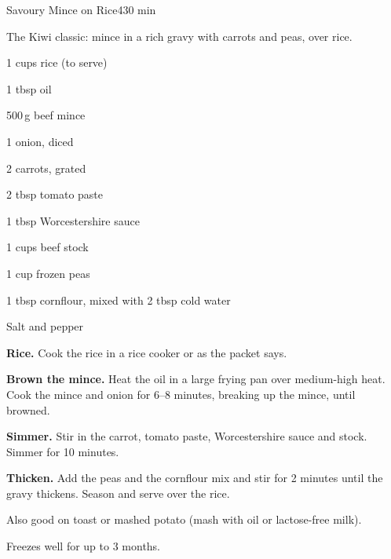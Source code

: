 \begin{recipebox}{Savoury Mince on Rice}{4}{30 min}

The Kiwi classic: mince in a rich gravy with carrots and peas, over rice.

\begin{ingredients}
  \item 1 cups rice (to serve)
  \item 1 tbsp oil
  \item 500\,g beef mince
  \item 1 onion, diced
  \item 2 carrots, grated
  \item 2 tbsp tomato paste
  \item 1 tbsp Worcestershire sauce
  \item 1 cups beef stock
  \item 1 cup frozen peas
  \item 1 tbsp cornflour, mixed with 2 tbsp cold water
  \item Salt and pepper
\end{ingredients}

\begin{method}
  \item \textbf{Rice.} Cook the rice in a rice cooker or as the packet says.
  \item \textbf{Brown the mince.} Heat the oil in a large frying pan over
        medium-high heat. Cook the mince and onion for 6--8 minutes, breaking up
        the mince, until browned.
  \item \textbf{Simmer.} Stir in the carrot, tomato paste, Worcestershire sauce and
        stock. Simmer for 10 minutes.
  \item \textbf{Thicken.} Add the peas and the cornflour mix and stir for 2 minutes
        until the gravy thickens. Season and serve over the rice.
\end{method}

\begin{notelist}
  \item Also good on toast or mashed potato (mash with oil or lactose-free milk).
  \item Freezes well for up to 3 months.
\end{notelist}

\end{recipebox}
